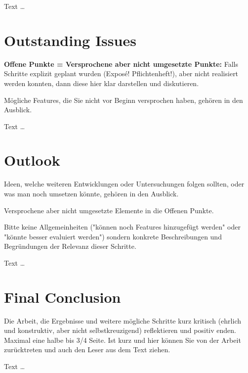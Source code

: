 \documentclass[11pt,a4paper,english]{scrreprt}
\newenvironment{comment}
  {\par\medskip
   \begingroup\color{olive}%
   }
 {\endgroup
  \medskip}
\begin{document}
Text \dots

\section{Outstanding Issues}
\begin{comment}
\textbf{Offene Punkte = Versprochene aber nicht umgesetzte Punkte:} Falls Schritte explizit geplant wurden (Exposé! Pflichtenheft!), aber nicht realisiert werden konnten, dann diese hier klar darstellen und diskutieren.

Mögliche Features, die Sie nicht vor Beginn versprochen haben, gehören in den Ausblick.
\end{comment}

Text \dots

\section{Outlook}
\begin{comment}
Ideen, welche weiteren Entwicklungen oder Untersuchungen folgen sollten, oder was man noch umsetzen könnte, gehören in den Ausblick.

Versprochene aber nicht umgesetzte Elemente in die Offenen Punkte.

Bitte keine Allgemeinheiten ("können noch Features hinzugefügt werden" oder "könnte besser evaluiert werden") sondern konkrete Beschreibungen und Begründungen der Relevanz dieser Schritte.
\end{comment}

Text \dots

\section{Final Conclusion}
\begin{comment}
Die Arbeit, die Ergebnisse und weitere mögliche Schritte kurz kritisch (ehrlich und konstruktiv, aber nicht selbstkreuzigend) reflektieren und positiv enden. Maximal eine halbe bis 3/4 Seite.
Ist kurz und hier können Sie von der Arbeit zurücktreten und auch den Leser aus dem Text ziehen.
\end{comment}

Text \dots

\clearpage

\end{document}
